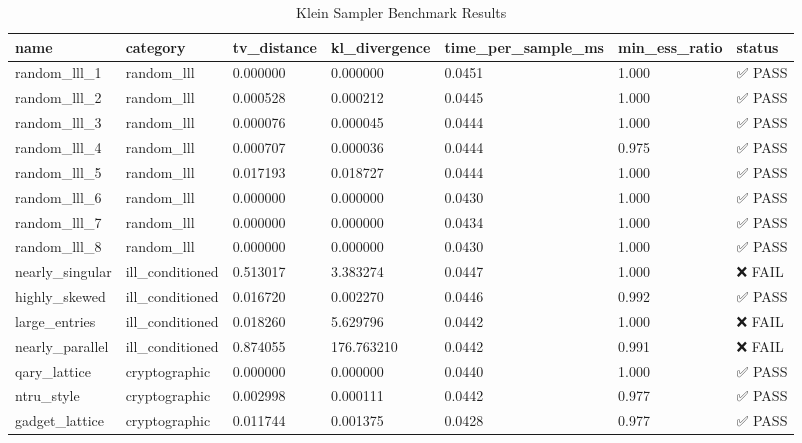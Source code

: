 \begin{table}
\caption{Klein Sampler Benchmark Results}
\label{tab:klein_benchmark}
\begin{tabular}{lllllll}
\toprule
name & category & tv_distance & kl_divergence & time_per_sample_ms & min_ess_ratio & status \\
\midrule
random_lll_1 & random_lll & 0.000000 & 0.000000 & 0.0451 & 1.000 & ✅ PASS \\
random_lll_2 & random_lll & 0.000528 & 0.000212 & 0.0445 & 1.000 & ✅ PASS \\
random_lll_3 & random_lll & 0.000076 & 0.000045 & 0.0444 & 1.000 & ✅ PASS \\
random_lll_4 & random_lll & 0.000707 & 0.000036 & 0.0444 & 0.975 & ✅ PASS \\
random_lll_5 & random_lll & 0.017193 & 0.018727 & 0.0444 & 1.000 & ✅ PASS \\
random_lll_6 & random_lll & 0.000000 & 0.000000 & 0.0430 & 1.000 & ✅ PASS \\
random_lll_7 & random_lll & 0.000000 & 0.000000 & 0.0434 & 1.000 & ✅ PASS \\
random_lll_8 & random_lll & 0.000000 & 0.000000 & 0.0430 & 1.000 & ✅ PASS \\
nearly_singular & ill_conditioned & 0.513017 & 3.383274 & 0.0447 & 1.000 & ❌ FAIL \\
highly_skewed & ill_conditioned & 0.016720 & 0.002270 & 0.0446 & 0.992 & ✅ PASS \\
large_entries & ill_conditioned & 0.018260 & 5.629796 & 0.0442 & 1.000 & ❌ FAIL \\
nearly_parallel & ill_conditioned & 0.874055 & 176.763210 & 0.0442 & 0.991 & ❌ FAIL \\
qary_lattice & cryptographic & 0.000000 & 0.000000 & 0.0440 & 1.000 & ✅ PASS \\
ntru_style & cryptographic & 0.002998 & 0.000111 & 0.0442 & 0.977 & ✅ PASS \\
gadget_lattice & cryptographic & 0.011744 & 0.001375 & 0.0428 & 0.977 & ✅ PASS \\
\bottomrule
\end{tabular}
\end{table}
